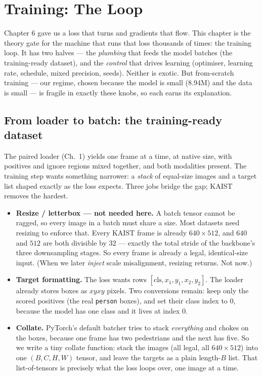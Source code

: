 \documentclass[../main.tex]{subfiles}
\begin{document}
\chapter{Training: The Loop}

Chapter 6 gave us a loss that turns and gradients that flow. This chapter is the theory gate for
the machine that runs that loss thousands of times: the training loop. It has two halves --- the
\emph{plumbing} that feeds the model batches (the training-ready dataset), and the \emph{control}
that drives learning (optimiser, learning rate, schedule, mixed precision, seeds). Neither is
exotic. But from-scratch training --- our regime, chosen because the model is small (8.94M) and the
data is small --- is fragile in exactly these knobs, so each earns its explanation.

\section{From loader to batch: the training-ready dataset}

The paired loader (Ch.~1) yields one frame at a time, at native size, with positives and ignore
regions mixed together, and both modalities present. The training step wants something narrower: a
\emph{stack} of equal-size images and a target list shaped exactly as the loss expects. Three jobs
bridge the gap; KAIST removes the hardest.

\begin{itemize}
  \item \textbf{Resize / letterbox --- not needed here.} A batch tensor cannot be ragged, so every
        image in a batch must share a size. Most datasets need resizing to enforce that. Every KAIST
        frame is already $640\times512$, and $640$ and $512$ are both divisible by $32$ --- exactly
        the total stride of the backbone's three downsampling stages. So every frame is already a
        legal, identical-size input. (When we later \emph{inject} scale misalignment, resizing
        returns. Not now.)
  \item \textbf{Target formatting.} The loss wants rows $[\text{cls}, x_1, y_1, x_2, y_2]$. The
        loader already stores boxes as $xyxy$ pixels. Two conversions remain: keep only the scored
        positives (the real \texttt{person} boxes), and set their class index to $0$, because the
        model has one class and it lives at index $0$.
  \item \textbf{Collate.} PyTorch's default batcher tries to stack \emph{everything} and chokes on
        the boxes, because one frame has two pedestrians and the next has five. So we write a tiny
        collate function: stack the images (all legal, all $640\times512$) into one
        $(B,C,H,W)$ tensor, and leave the targets as a plain length-$B$ list. That list-of-tensors
        is precisely what the loss loops over, one image at a time.
\end{itemize}
\end{document}
